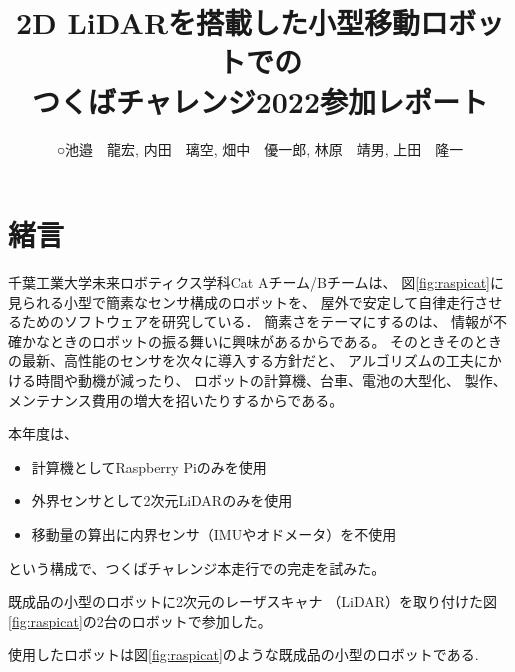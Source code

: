 \documentclass[twocolumn,9pt]{jsproceedings}
\title{2D LiDARを搭載した小型移動ロボットでの\\つくばチャレンジ2022参加レポート}
\author{○池邉　龍宏\authorrefmark{1}, 内田　璃空\authorrefmark{1}, 畑中　優一郎\authorrefmark{1}, 林原　靖男\authorrefmark{1}, 上田　隆一\authorrefmark{1}}
\affiliation{千葉工業大学 未来ロボティクス学科 Cat Aチーム}
\begin{document}
\maketitle



\section{緒言}

千葉工業大学未来ロボティクス学科Cat Aチーム/Bチームは、
図\ref{fig:raspicat}に見られる小型で簡素なセンサ構成のロボットを、
屋外で安定して自律走行させるためのソフトウェアを研究している．
簡素さをテーマにするのは、
情報が不確かなときのロボットの振る舞いに興味があるからである。
そのときそのときの最新、高性能のセンサを次々に導入する方針だと、
アルゴリズムの工夫にかける時間や動機が減ったり、
ロボットの計算機、台車、電池の大型化、
製作、メンテナンス費用の増大を招いたりするからである。


本年度は、
\begin{itemize}
\item 計算機としてRaspberry Piのみを使用
\item 外界センサとして2次元LiDARのみを使用
\item 移動量の算出に内界センサ（IMUやオドメータ）を不使用
\end{itemize}
という構成で、つくばチャレンジ本走行での完走を試みた。

既成品の小型のロボットに2次元のレーザスキャナ
（LiDAR）を取り付けた図\ref{fig:raspicat}の2台のロボットで参加した。

使用したロボットは図\ref{fig:raspicat}のような既成品の小型のロボットである. 
\end{document}
